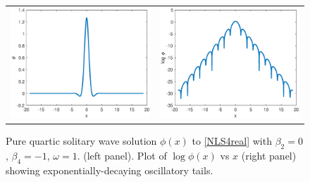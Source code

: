 \documentclass[12pt]{article}
\begin{document}
\begin{figure}[H]
\centering
\begin{tabular}{cc}
\includegraphics[width=8cm]{images/PQS1.eps} &
\includegraphics[width=8cm]{images/PQS1log.eps}
\end{tabular}
\caption{Pure quartic solitary wave solution $\phi(x)$ to \cref{NLS4real} with $\beta_2 = 0$, $\beta_4 = -1$, $\omega = 1$. (left panel). Plot of $\log \phi(x)$ vs $x$ (right panel) showing exponentially-decaying oscillatory tails. }
\label{fig:PQS}
\end{figure} 
\end{document}
